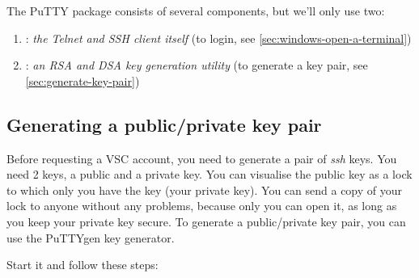   The PuTTY package consists of several components, but we'll only use two:

  \begin{enumerate}
    \item  {}: \emph{the Telnet and SSH client itself}
         (to login, see \autoref{sec:windows-open-a-terminal})
    \item  {}: \emph{an RSA and DSA key generation utility}
        (to generate a key pair, see \autoref{sec:generate-key-pair})
  \end{enumerate}

  \subsection{Generating a public/private key pair}
  \label{sec:generate-key-pair}

  Before requesting a VSC account, you need to generate a pair of \emph{ssh}
  keys. You need 2 keys, a public and a private key. You can visualise the public
  key as a lock to which only you have the key (your private key). You can send
  a copy of your lock to anyone without any problems, because only you can
  open it, as long as you keep your private key secure.
  To generate a public/private key pair, you can use the PuTTYgen key generator.

  Start  it and follow these steps:

